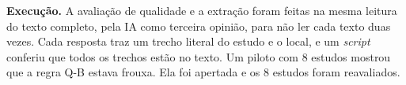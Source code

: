 \textbf{Execução.} A avaliação de qualidade e a extração foram feitas na
mesma leitura do texto completo, pela IA como terceira opinião, para não ler
cada texto duas vezes. Cada resposta traz um trecho literal do estudo e o
local, e um \textit{script} conferiu que todos os trechos estão no texto. Um
piloto com 8 estudos mostrou que a regra Q-B estava frouxa. Ela foi apertada
e os 8 estudos foram reavaliados.
